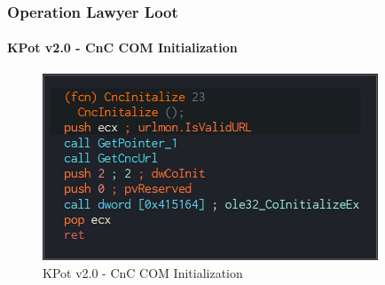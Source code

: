 \documentclass[aspectratio=169]{beamer}
\begin{document}
{
\begin{frame}
  \frametitle{Operation Lawyer Loot}
  \framesubtitle{KPot v2.0 - CnC COM Initialization}
  \begin{figure}
    \includegraphics[width=10cm]{kpot-cnc-init-com}
    \caption{KPot v2.0 - CnC COM Initialization}
  \end{figure}
\end{frame}
}
\end{document}
